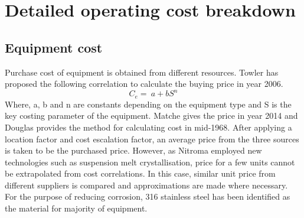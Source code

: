 \section{Detailed operating cost breakdown}
\subsection{Equipment cost}
Purchase cost of equipment is obtained from different resources. Towler\cite{sinnott_chemical_2020} has proposed the following correlation to calculate the buying price in year 2006.
\begin{equation}
    C_{e}=\ a+bS^n
\end{equation}
Where, a, b and n are constants depending on the equipment type and S is the key costing parameter of the equipment. Matche\cite{noauthor_matches_nodate} gives the price in year 2014 and Douglas\cite{douglas_conceptual_1988} provides the method for calculating cost in mid-1968. After applying a location factor and cost escalation factor, an average price from the three sources is taken to be the purchased price. However, as Nitroma employed new technologies such as suspension melt crystallisation, price for a few units cannot be extrapolated from cost correlations. In this case, similar unit price from different suppliers is compared and approximations are made where necessary. For the purpose of reducing corrosion, 316 stainless steel has been identified as the material for majority of equipment.

